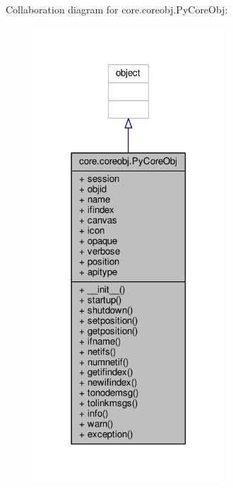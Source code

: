 Collaboration diagram for core.\+coreobj.\+Py\+Core\+Obj\+:
\nopagebreak
\begin{figure}[H]
\begin{center}
\leavevmode
\includegraphics[width=201pt]{classcore_1_1coreobj_1_1_py_core_obj__coll__graph}
\end{center}
\end{figure}
